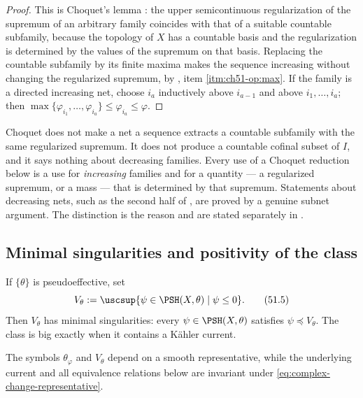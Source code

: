 \begin{proof}
This is Choquet's lemma \cite{DemBook}: the upper
semicontinuous regularization of the supremum of an arbitrary family
coincides with that of a suitable countable subfamily, because the
topology of \(X\) has a countable basis and the regularization is
determined by the values of the supremum on that basis.  Replacing the
countable subfamily by its finite maxima makes the sequence increasing
without changing the regularized supremum, by
, item \cref{itm:ch51-op:max}.  If the
family is a directed increasing net, choose \(i_a\) inductively above
\(i_{a-1}\) and above \(i_1,\ldots,i_a\); then
\(\max\{\varphi_{i_1},\ldots,\varphi_{i_a}\}\leq\varphi_{i_a}\leq\varphi\).
\end{proof}

\begin{warning}{Choquet does not make a net a sequence}
\label{warn:ch51-choquet}
 extracts a countable subfamily with the same
regularized supremum.  It does not produce a countable cofinal subset of
\(I\), and it says nothing about decreasing families.  Every use of a
Choquet reduction below is a use for \emph{increasing} families and for a
quantity --- a regularized supremum, or a mass --- that is determined by
that supremum.  Statements about decreasing nets, such as the second half
of , are proved by a genuine subnet
argument.  The distinction is the reason
 and
 are stated separately in
.
\end{warning}

\subsection{Minimal singularities and positivity of the class}
\label{sec:ch51-minimal}

\begin{definition}
\label{def:complex-minimal-potential}
If \(\{\theta\}\) is pseudoeffective, set
\[
 V_\theta
 :=\uscsup\{\psi\in\PSH(X,\theta)\mid \psi\leq0\}.
\tag{51.5}\label{eq:complex-vtheta}
\]
Then \(V_\theta\) has minimal singularities: every
\(\psi\in\PSH(X,\theta)\) satisfies \(\psi\preceq V_\theta\).
The class is big exactly when it contains a K\"ahler current.
\end{definition}

\begin{remark}
The symbols \(\theta_\varphi\) and \(V_\theta\) depend on a smooth
representative, while the underlying current and all equivalence
relations below are invariant under
\eqref{eq:complex-change-representative}.
\end{remark}

